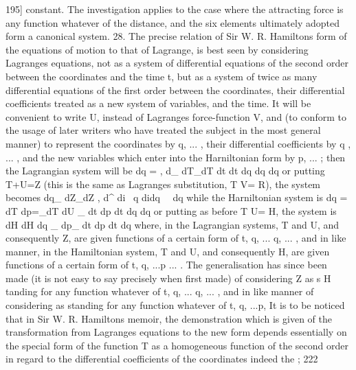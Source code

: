 \documentclass[11pt,a4paper]{book}
\begin{document}

195]
constant. The investigation applies to the case where the attracting force is any
function whatever of the distance, and the six elements ultimately adopted form a
canonical system.
28. The precise relation of Sir W. R. Hamiltons form of the equations of motion
to that of Lagrange, is best seen by considering Lagranges equations, not as a system
of differential equations of the second order between the coordinates and the time t,
but as a system of twice as many differential equations of the first order between the
coordinates, their differential coefficients treated as a new system of variables, and the
time. It will be convenient to write U, instead of Lagranges force-function V, and
(to conform to the usage of later writers who have treated the subject in the most
general manner) to represent the coordinates by q, ... , their differential coefficients by
q , ... , and the new variables which enter into the Harniltonian form by p, ... ; then
the Lagrangian system will be
dq = , d_ dT_dT
dt dt dq dq dq
or putting T+U=Z (this is the same as Lagranges substitution, T V= R), the
system becomes
dq_ dZ_dZ
, d^
di~ q didq~ ~dq
while the Harniltonian system is
dq = dT dp=_dT dU
_
dt dp dt dq dq
or putting as before T U= H, the system is
dH dH
dq _ dp_
dt dp dt dq
where, in the Lagrangian systems, T and U, and consequently Z, are given functions
of a certain form of t, q, ... q, ... , and in like manner, in the Hamiltonian system,
T and U, and consequently H, are given functions of a certain form of t, q, ...p ... .
The generalisation has since been made (it is not easy to say precisely when first
made) of considering Z as s H tanding for any function whatever of t, q, ... q, ... , and in
like manner of considering as standing for any function whatever of t, q, ...p,
It is to be noticed that in Sir W. R. Hamiltons memoir, the demonstration which is
given of the transformation from Lagranges equations to the new form depends
essentially on the special form of the function T as a homogeneous function of the
second order in regard to the differential coefficients of the coordinates indeed the
; 222


\end{document}
